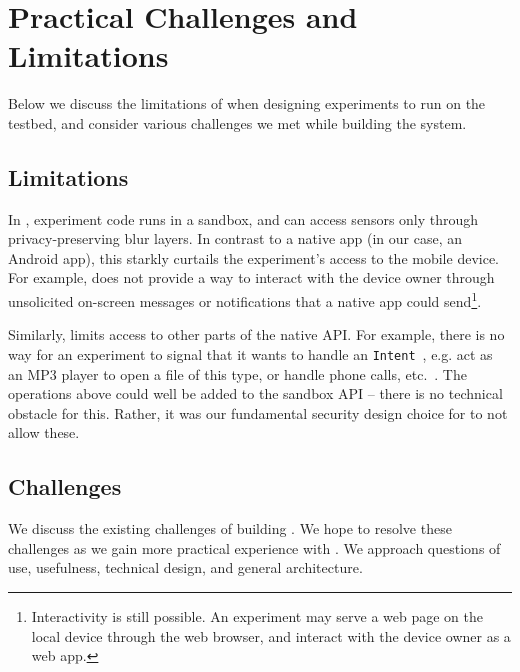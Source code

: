 \section{Practical Challenges and Limitations}\label{sec-limitation}

Below we discuss the limitations of \sysname 
when designing experiments to run on the testbed, 
and consider various challenges we met while building the system.

\subsection{Limitations}\label{subsec-limitations}
In \sysname, experiment code runs in a sandbox, and 
can access sensors only through privacy-preserving blur layers. 
In contrast to a native app (in our case, an Android app), this starkly curtails 
the experiment's access to the mobile device. For example, \sysname 
does not provide a way to interact with the device owner 
through unsolicited on-screen messages or notifications that a native 
app could send\footnote{\scriptsize Interactivity is still possible. 
An experiment may serve a web 
page on the local device through the web browser, and interact with 
the device owner as a web app.}. 

Similarly, \sysname limits access to other parts 
of the native API. For example, there is no way for an experiment to 
signal that it wants to handle an \texttt{Intent}~\cite{intent}, e.g. 
act as an MP3 player to open a file of this type, or handle phone calls, 
etc.~\cite{intent-dev}.
The operations above 
could well be added to the sandbox API -- there is no technical 
obstacle for this. Rather, it was our fundamental security design 
choice for \sysname to not allow these.


\subsection{Challenges}\label{subsec-challenges}

We discuss the existing challenges of building \sysname. We hope to 
resolve these challenges as we gain more practical experience with 
\sysname.
We approach questions of use, usefulness, technical design, and
general architecture.


